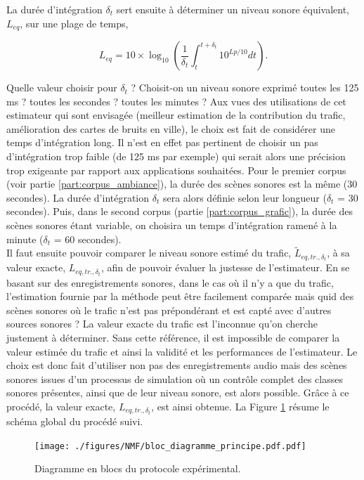 La durée d'intégration $\delta_t$ sert ensuite à déterminer un niveau sonore équivalent, $L_{eq}$, sur une plage de temps,

\begin{equation}
L_{eq} = 10 \times \log_{10}\left(\frac{1}{\delta_t} \int_t^{t+\delta_t} 10^{Lp/10} dt \right).
\end{equation}

Quelle valeur choisir pour $\delta_t$ ? Choisit-on un niveau sonore exprimé toutes les 125 ms ? toutes les secondes ? toutes les minutes ? Aux vues des utilisations de cet estimateur qui sont envisagée (meilleur estimation de la contribution du trafic, amélioration des cartes de bruits en ville), le choix est fait de considérer une temps d'intégration long. Il n'est en effet pas pertinent de choisir un pas d'intégration trop faible (de 125 ms par exemple) qui serait alors une précision trop exigeante par rapport aux applications souhaitées. 
Pour le premier corpus (voir partie \ref{part:corpus_ambiance}), la durée des scènes sonores est la même (30 secondes). La durée d'intégration $\delta_t$  sera alors définie selon leur longueur ($\delta_t$ = 30 secondes). Puis, dans le second corpus (partie \ref{part:corpus_grafic}), la durée des scènes sonores étant variable, on choisira un temps d'intégration ramené à la minute ($\delta_t$ = 60 secondes).\\

Il faut ensuite pouvoir comparer le niveau sonore estimé du trafic, $\tilde{L}_{eq,tr., \delta_t}$, à sa valeur exacte, $L_{eq,tr., \delta_t}$, afin de pouvoir évaluer la justesse de l'estimateur. En se basant sur des enregistrements sonores, dans le cas où il n'y a que du trafic, l'estimation fournie par la méthode peut être facilement comparée mais quid des scènes sonores où le trafic n'est pas prépondérant et est capté avec d'autres sources sonores ? La valeur exacte du trafic est l'inconnue qu'on cherche justement à déterminer. Sans cette référence, il est impossible de comparer la valeur estimée du trafic et ainsi la validité et les performances de l'estimateur.
Le choix est donc fait d'utiliser non pas des enregistrements audio mais des scènes sonores issues d'un processus de simulation où un contrôle complet des classes sonores présentes, ainsi que de leur niveau sonore, est alors possible. Grâce à ce procédé, la valeur exacte, $L_{eq,tr.,\delta_t}$, est ainsi obtenue. La Figure \ref{fig:diagramBlocProtocol} résume le schéma global du procédé suivi.

\begin{figure}[ht]
\centering
\texttt{[image: ./figures/NMF/bloc\_diagramme\_principe.pdf.pdf]}
\caption{Diagramme en blocs du protocole expérimental.}
\label{fig:diagramBlocProtocol}
\end{figure}

